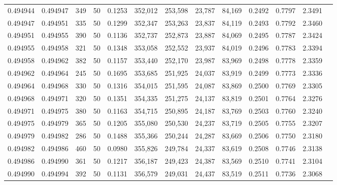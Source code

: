 \begin{tabular}{rrrrrrrrrrrrr}
0.494944 & 0.494947 &   349 &  50 &                                     0.1253 & 352,012 & 253,598 &  23,787 &  84,169 & 0.2492 & 0.7797 & 2.3491 \\
0.494947 & 0.494951 &   335 &  50 &                                     0.1299 & 352,347 & 253,263 &  23,837 &  84,119 & 0.2493 & 0.7792 & 2.3460 \\
0.494951 & 0.494955 &   390 &  50 &                                     0.1136 & 352,737 & 252,873 &  23,887 &  84,069 & 0.2495 & 0.7787 & 2.3424 \\
0.494955 & 0.494958 &   321 &  50 &                                     0.1348 & 353,058 & 252,552 &  23,937 &  84,019 & 0.2496 & 0.7783 & 2.3394 \\
0.494958 & 0.494962 &   382 &  50 &                                     0.1157 & 353,440 & 252,170 &  23,987 &  83,969 & 0.2498 & 0.7778 & 2.3359 \\
0.494962 & 0.494964 &   245 &  50 &                                     0.1695 & 353,685 & 251,925 &  24,037 &  83,919 & 0.2499 & 0.7773 & 2.3336 \\
0.494964 & 0.494968 &   330 &  50 &                                     0.1316 & 354,015 & 251,595 &  24,087 &  83,869 & 0.2500 & 0.7769 & 2.3305 \\
0.494968 & 0.494971 &   320 &  50 &                                     0.1351 & 354,335 & 251,275 &  24,137 &  83,819 & 0.2501 & 0.7764 & 2.3276 \\
0.494971 & 0.494975 &   380 &  50 &                                     0.1163 & 354,715 & 250,895 &  24,187 &  83,769 & 0.2503 & 0.7760 & 2.3240 \\
0.494975 & 0.494979 &   365 &  50 &                                     0.1205 & 355,080 & 250,530 &  24,237 &  83,719 & 0.2505 & 0.7755 & 2.3207 \\
0.494979 & 0.494982 &   286 &  50 &                                     0.1488 & 355,366 & 250,244 &  24,287 &  83,669 & 0.2506 & 0.7750 & 2.3180 \\
0.494982 & 0.494986 &   460 &  50 &                                     0.0980 & 355,826 & 249,784 &  24,337 &  83,619 & 0.2508 & 0.7746 & 2.3138 \\
0.494986 & 0.494990 &   361 &  50 &                                     0.1217 & 356,187 & 249,423 &  24,387 &  83,569 & 0.2510 & 0.7741 & 2.3104 \\
0.494990 & 0.494994 &   392 &  50 &                                     0.1131 & 356,579 & 249,031 &  24,437 &  83,519 & 0.2511 & 0.7736 & 2.3068 \\

\end{tabular}
